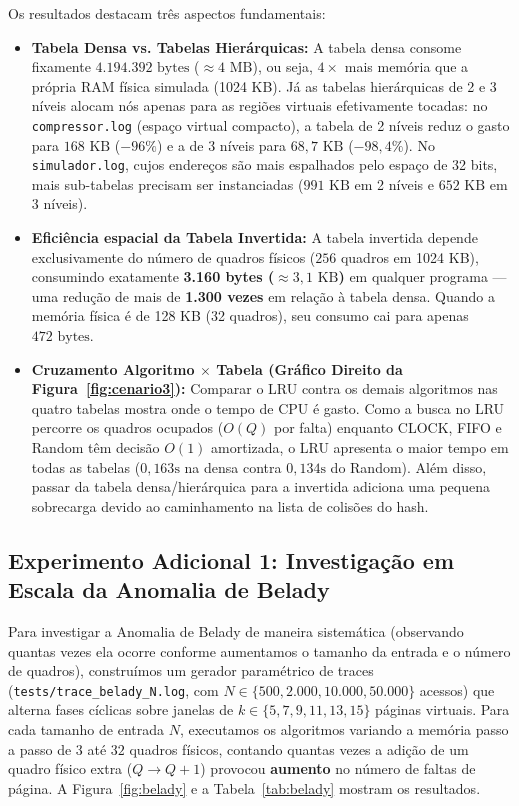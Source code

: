 \documentclass[12pt,a4paper]{article}
\begin{document}
Os resultados destacam três aspectos fundamentais:
\begin{itemize}
    \item \textbf{Tabela Densa vs. Tabelas Hierárquicas:} A tabela densa consome fixamente $4.194.392\text{ bytes}$ ($\approx 4\text{ MB}$), ou seja, $4\times$ mais memória que a própria RAM física simulada (1024 KB). Já as tabelas hierárquicas de 2 e 3 níveis alocam nós apenas para as regiões virtuais efetivamente tocadas: no \texttt{compressor.log} (espaço virtual compacto), a tabela de 2 níveis reduz o gasto para $168\text{ KB}$ ($-96\%$) e a de 3 níveis para $68,7\text{ KB}$ ($-98,4\%$). No \texttt{simulador.log}, cujos endereços são mais espalhados pelo espaço de 32 bits, mais sub-tabelas precisam ser instanciadas ($991\text{ KB}$ em 2 níveis e $652\text{ KB}$ em 3 níveis).
    \item \textbf{Eficiência espacial da Tabela Invertida:} A tabela invertida depende exclusivamente do número de quadros físicos ($256$ quadros em 1024 KB), consumindo exatamente \textbf{3.160 bytes ($\approx 3,1\text{ KB}$)} em qualquer programa --- uma redução de mais de \textbf{1.300 vezes} em relação à tabela densa. Quando a memória física é de 128 KB (32 quadros), seu consumo cai para apenas $472\text{ bytes}$.
    \item \textbf{Cruzamento Algoritmo $\times$ Tabela (Gráfico Direito da Figura~\ref{fig:cenario3}):} Comparar o LRU contra os demais algoritmos nas quatro tabelas mostra onde o tempo de CPU é gasto. Como a busca no LRU percorre os quadros ocupados ($O(Q)$ por falta) enquanto CLOCK, FIFO e Random têm decisão $O(1)$ amortizada, o LRU apresenta o maior tempo em todas as tabelas ($0,163\text{s}$ na densa contra $0,134\text{s}$ do Random). Além disso, passar da tabela densa/hierárquica para a invertida adiciona uma pequena sobrecarga devido ao caminhamento na lista de colisões do hash.
\end{itemize}

\subsection{Experimento Adicional 1: Investigação em Escala da Anomalia de Belady}

Para investigar a Anomalia de Belady de maneira sistemática (observando quantas vezes ela ocorre conforme aumentamos o tamanho da entrada e o número de quadros), construímos um gerador paramétrico de traces (\texttt{tests/trace\_belady\_N.log}, com $N \in \{500, 2.000, 10.000, 50.000\}$ acessos) que alterna fases cíclicas sobre janelas de $k \in \{5, 7, 9, 11, 13, 15\}$ páginas virtuais. Para cada tamanho de entrada $N$, executamos os algoritmos variando a memória passo a passo de $3$ até $32$ quadros físicos, contando quantas vezes a adição de um quadro físico extra ($Q \rightarrow Q+1$) provocou \textbf{aumento} no número de faltas de página. A Figura~\ref{fig:belady} e a Tabela~\ref{tab:belady} mostram os resultados.
\end{document}
